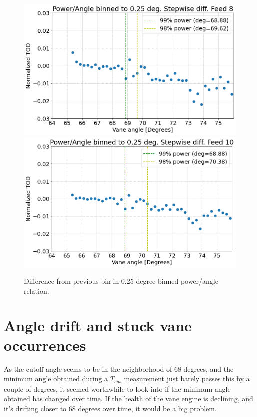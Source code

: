 \documentclass[10pt, a4paper]{article}
\begin{document}
\vspace{1cm}
\begin{figure}[H]
    \centering
    \includegraphics[scale=0.37]{../plots/binned_diff8.png}
    \includegraphics[scale=0.37]{../plots/binned_diff10.png}
    \caption{Difference from previous bin in 0.25 degree binned power/angle relation.}
    \label{fig:8and10_diff}
\end{figure}


\section{Angle drift and stuck vane occurrences}
As the cutoff angle seems to be in the neighborhood of 68 degrees, and the minimum angle obtained during a $T_{sys}$ measurement just barely passes this by a couple of degrees, it seemed worthwhile to look into if the minimum angle obtained has changed over time. If the health of the vane engine is declining, and it's drifting closer to 68 degrees over time, it would be a big problem.
\end{document}
